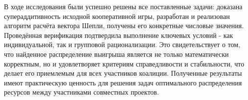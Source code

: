 \conclusion

В ходе исследования были успешно решены все поставленные задачи: доказана супераддитивность исходной кооперативной игры, разработан и реализован алгоритм расчёта вектора Шепли,
получены его конкретные числовые значения. Проведённая верификация подтвердила выполнение ключевых условий - как индивидуальной, так и групповой рационализации. Это свидетельствует
о том, что найденное распределение выигрыша является не только математически корректным, но и удовлетворяет критериям справедливости и стабильности, что делает его приемлемым для
всех участников коалиции. Полученные результаты имеют практическую ценность для решения задач оптимального распределения ресурсов между участниками совместных проектов.
